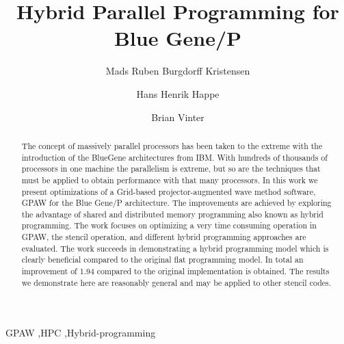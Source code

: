 \documentclass[preprint,3p,times,twocolumn]{elsarticle}
\begin{document}
\begin{frontmatter}



\title{Hybrid Parallel Programming for Blue Gene/P}


\author{Mads Ruben Burgdorff Kristensen}
\author{Hans Henrik Happe}
\author{Brian Vinter}
\address{eScience Center - University of Copenhagen Denmark}

\begin{abstract}
The concept of massively parallel processors has been taken to the extreme with the introduction of the BlueGene architectures from IBM. With hundreds of thousands of processors in one machine the parallelism is extreme, but so are the techniques that must be applied to obtain performance with that many processors. 
In this work we present optimizations of a Grid-based projector-augmented wave method software, GPAW \cite{Mortensen05} for the Blue Gene/P architecture. The improvements are achieved by exploring the advantage of shared and distributed memory programming also known as hybrid programming. The work focuses on optimizing a very time consuming operation in GPAW, the stencil operation, and different hybrid programming approaches are evaluated. The work succeeds in demonstrating a hybrid programming model which is clearly beneficial compared to the original flat programming model. In total an improvement of 1.94 compared to the original implementation is obtained. The results we demonstrate here are reasonably general and may be applied to other stencil codes.
\end{abstract}

\begin{keyword}
GPAW \sep HPC \sep Hybrid-programming


\end{keyword}

\end{frontmatter}
\end{document}
